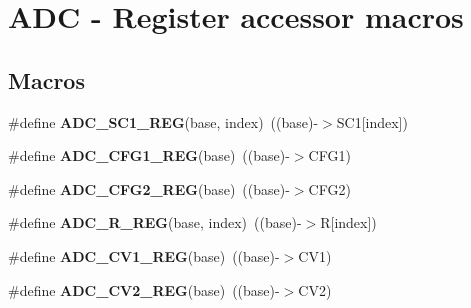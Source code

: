 \hypertarget{group__ADC__Register__Accessor__Macros}{}\section{A\+DC -\/ Register accessor macros}
\label{group__ADC__Register__Accessor__Macros}
\subsection*{Macros}
\begin{DoxyCompactItemize}
\item 
\#define {\bfseries A\+D\+C\+\_\+\+S\+C1\+\_\+\+R\+EG}(base,  index)~((base)-\/$>$S\+C1\mbox{[}index\mbox{]})\hypertarget{group__ADC__Register__Accessor__Macros_ga1b28fcb3112387441ecc5fe9251a32e9}{}\label{group__ADC__Register__Accessor__Macros_ga1b28fcb3112387441ecc5fe9251a32e9}

\item 
\#define {\bfseries A\+D\+C\+\_\+\+C\+F\+G1\+\_\+\+R\+EG}(base)~((base)-\/$>$C\+F\+G1)\hypertarget{group__ADC__Register__Accessor__Macros_gaa64d6563b96bb9c13693c466528decd7}{}\label{group__ADC__Register__Accessor__Macros_gaa64d6563b96bb9c13693c466528decd7}

\item 
\#define {\bfseries A\+D\+C\+\_\+\+C\+F\+G2\+\_\+\+R\+EG}(base)~((base)-\/$>$C\+F\+G2)\hypertarget{group__ADC__Register__Accessor__Macros_gad5bd555e9653cefc30e9fdb2834f7a57}{}\label{group__ADC__Register__Accessor__Macros_gad5bd555e9653cefc30e9fdb2834f7a57}

\item 
\#define {\bfseries A\+D\+C\+\_\+\+R\+\_\+\+R\+EG}(base,  index)~((base)-\/$>$R\mbox{[}index\mbox{]})\hypertarget{group__ADC__Register__Accessor__Macros_gaecd126e0e0812785b36331de88019dde}{}\label{group__ADC__Register__Accessor__Macros_gaecd126e0e0812785b36331de88019dde}

\item 
\#define {\bfseries A\+D\+C\+\_\+\+C\+V1\+\_\+\+R\+EG}(base)~((base)-\/$>$C\+V1)\hypertarget{group__ADC__Register__Accessor__Macros_ga8b184f4f094f655e551a528ee645df65}{}\label{group__ADC__Register__Accessor__Macros_ga8b184f4f094f655e551a528ee645df65}

\item 
\#define {\bfseries A\+D\+C\+\_\+\+C\+V2\+\_\+\+R\+EG}(base)~((base)-\/$>$C\+V2)\hypertarget{group__ADC__Register__Accessor__Macros_gac443a67da1afc78c3f8a34426efd7fdc}{}\label{group__ADC__Register__Accessor__Macros_gac443a67da1afc78c3f8a34426efd7fdc}


\end{DoxyCompactItemize}
